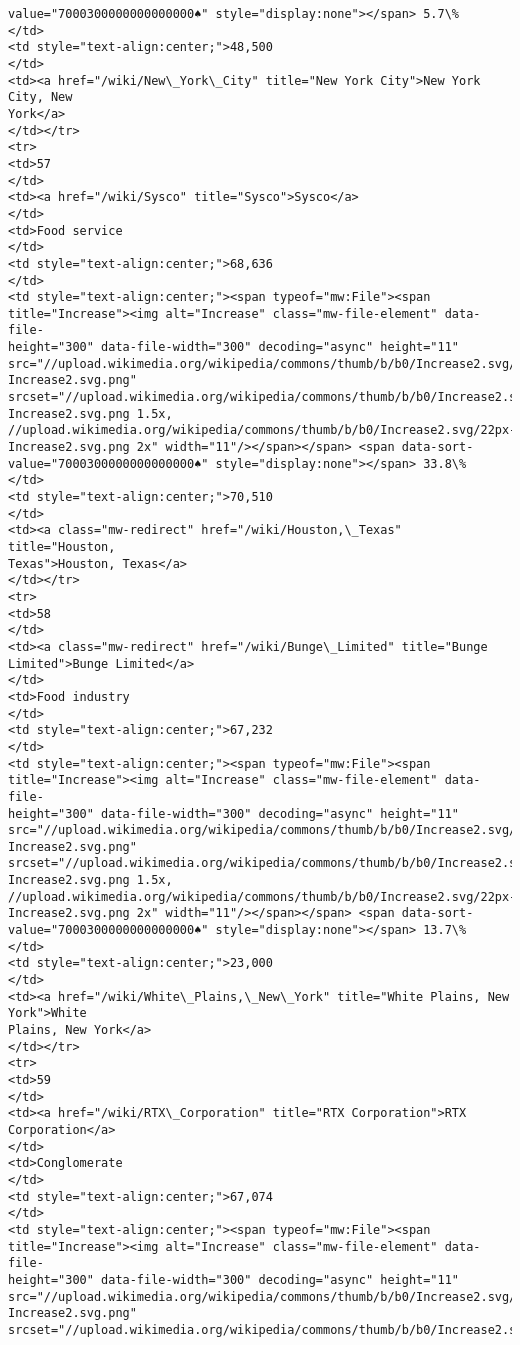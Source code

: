 \documentclass[11pt]{article}
\begin{document}
\begin{Verbatim}[commandchars=\\\{\}]
value="7000300000000000000♠" style="display:none"></span> 5.7\%
</td>
<td style="text-align:center;">48,500
</td>
<td><a href="/wiki/New\_York\_City" title="New York City">New York City, New
York</a>
</td></tr>
<tr>
<td>57
</td>
<td><a href="/wiki/Sysco" title="Sysco">Sysco</a>
</td>
<td>Food service
</td>
<td style="text-align:center;">68,636
</td>
<td style="text-align:center;"><span typeof="mw:File"><span
title="Increase"><img alt="Increase" class="mw-file-element" data-file-
height="300" data-file-width="300" decoding="async" height="11"
src="//upload.wikimedia.org/wikipedia/commons/thumb/b/b0/Increase2.svg/11px-
Increase2.svg.png"
srcset="//upload.wikimedia.org/wikipedia/commons/thumb/b/b0/Increase2.svg/17px-
Increase2.svg.png 1.5x,
//upload.wikimedia.org/wikipedia/commons/thumb/b/b0/Increase2.svg/22px-
Increase2.svg.png 2x" width="11"/></span></span> <span data-sort-
value="7000300000000000000♠" style="display:none"></span> 33.8\%
</td>
<td style="text-align:center;">70,510
</td>
<td><a class="mw-redirect" href="/wiki/Houston,\_Texas" title="Houston,
Texas">Houston, Texas</a>
</td></tr>
<tr>
<td>58
</td>
<td><a class="mw-redirect" href="/wiki/Bunge\_Limited" title="Bunge
Limited">Bunge Limited</a>
</td>
<td>Food industry
</td>
<td style="text-align:center;">67,232
</td>
<td style="text-align:center;"><span typeof="mw:File"><span
title="Increase"><img alt="Increase" class="mw-file-element" data-file-
height="300" data-file-width="300" decoding="async" height="11"
src="//upload.wikimedia.org/wikipedia/commons/thumb/b/b0/Increase2.svg/11px-
Increase2.svg.png"
srcset="//upload.wikimedia.org/wikipedia/commons/thumb/b/b0/Increase2.svg/17px-
Increase2.svg.png 1.5x,
//upload.wikimedia.org/wikipedia/commons/thumb/b/b0/Increase2.svg/22px-
Increase2.svg.png 2x" width="11"/></span></span> <span data-sort-
value="7000300000000000000♠" style="display:none"></span> 13.7\%
</td>
<td style="text-align:center;">23,000
</td>
<td><a href="/wiki/White\_Plains,\_New\_York" title="White Plains, New York">White
Plains, New York</a>
</td></tr>
<tr>
<td>59
</td>
<td><a href="/wiki/RTX\_Corporation" title="RTX Corporation">RTX Corporation</a>
</td>
<td>Conglomerate
</td>
<td style="text-align:center;">67,074
</td>
<td style="text-align:center;"><span typeof="mw:File"><span
title="Increase"><img alt="Increase" class="mw-file-element" data-file-
height="300" data-file-width="300" decoding="async" height="11"
src="//upload.wikimedia.org/wikipedia/commons/thumb/b/b0/Increase2.svg/11px-
Increase2.svg.png"
srcset="//upload.wikimedia.org/wikipedia/commons/thumb/b/b0/Increase2.svg/17px-

\end{Verbatim}
\end{document}
